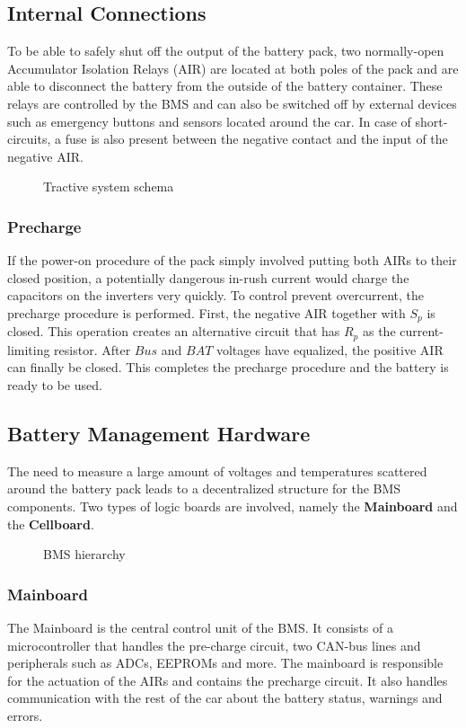 \subsection{Internal Connections}
To be able to safely shut off the output of the battery pack, two normally-open Accumulator Isolation Relays (AIR) \cite[EV 5.6]{fsg2020} are located at both poles of the pack and are able to disconnect the battery from the outside of the battery container. These relays are controlled by the BMS and can also be switched off by external devices such as emergency buttons and sensors located around the car. In case of short-circuits, a fuse is also present between the negative contact and the input of the negative AIR.
\begin{figure}[h]
    \centering
    
    \caption{Tractive system schema}
    \label{fig:tractive_system_detail}
\end{figure}
\subsubsection{Precharge}
If the power-on procedure of the pack simply involved putting both AIRs to their closed position, a potentially dangerous in-rush current would charge the capacitors on the inverters very quickly. To control prevent overcurrent, the precharge procedure is performed.
First, the negative AIR together with $S_p$ is closed. This operation creates an alternative circuit that has $R_p$ as the current-limiting resistor. After $Bus$ and $BAT$ voltages have equalized, the positive AIR can finally be closed. This completes the precharge procedure and the battery is ready to be used.

\subsection{Battery Management Hardware}
The need to measure a large amount of voltages and temperatures scattered around the battery pack leads to a decentralized structure for the BMS components. Two types of logic boards are involved, namely the \textbf{Mainboard} and the \textbf{Cellboard}.\\
\begin{figure}[h]
    \centering
    
    \caption{BMS hierarchy}
    \label{fig:bms_hierarchy}
\end{figure}

\subsubsection{Mainboard}
The Mainboard is the central control unit of the BMS. It consists of a microcontroller that handles the pre-charge circuit, two CAN-bus lines and peripherals such as ADCs, EEPROMs and more. The mainboard is responsible for the actuation of the AIRs and contains the precharge circuit. It also handles communication with the rest of the car about the battery status, warnings and errors.

